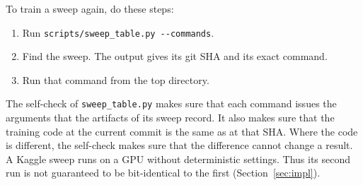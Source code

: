 To train a sweep again, do these steps:
\begin{enumerate}
  \item Run \texttt{scripts/sweep\_table.py -{}-commands}.
  \item Find the sweep. The output gives its git SHA and its exact command.
  \item Run that command from the top directory.
\end{enumerate}

The self-check of \texttt{sweep\_table.py} makes sure that each command issues the arguments
that the artifacts of its sweep record. It also makes sure that the training code at the
current commit is the same as at that SHA. Where the code is different, the self-check makes
sure that the difference cannot change a result. A Kaggle
sweep runs on a GPU without deterministic settings. Thus its second run is not guaranteed to be
bit-identical to the first (Section~\ref{sec:impl}).
